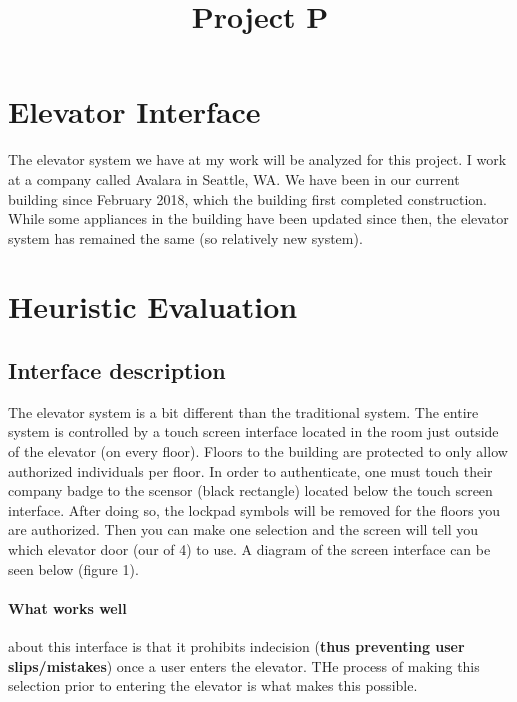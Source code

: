 

\title{Project P\\}



\maketitle
\thispagestyle{fancy}

\section{Elevator Interface}
The elevator system we have at my work will be analyzed for this project. I work at a company called Avalara in Seattle, WA. We have been in our current building since February 2018, which the building first completed construction. While some appliances in the building have been updated since then, the elevator system has remained the same (so relatively new system).

\section{Heuristic Evaluation}

\subsection{Interface description}
The elevator system is a bit different than the traditional system. The entire system is controlled by a touch screen interface located in the room just outside of the elevator (on every floor). Floors to the building are protected to only allow authorized individuals per floor. In order to authenticate, one must touch their company badge to the scensor (black rectangle) located below the touch screen interface. After doing so, the lockpad symbols will be removed for the floors you are authorized. Then you can make one selection and the screen will tell you which elevator door (our of 4) to use. A diagram of the screen interface can be seen below (figure 1).

\paragraph{What works well} about this interface is that it prohibits indecision (\textbf{thus preventing user slips/mistakes}) once a user enters the elevator. THe process of making this selection prior to entering the elevator is what makes this possible.

